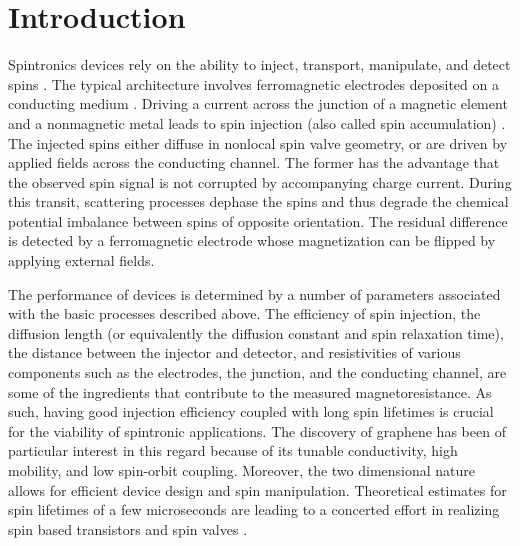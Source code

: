 \section{Introduction}

Spintronics devices rely on the ability to inject, transport, manipulate, and detect spins
\cite{Wolf16112001, RevModPhys.76.323}.
The typical architecture involves ferromagnetic electrodes deposited on a conducting medium
\cite{1990ApPhL..56..665D, Jedema2001}.
Driving a current across the junction of a magnetic element and a nonmagnetic metal
leads to spin injection (also called spin accumulation)
\cite{PhysRevLett.55.1790, Jedema2001, Yang2008, PhysRevLett.94.196601}.
The injected spins either diffuse in nonlocal spin valve geometry,
or are driven by applied fields across the conducting channel.
The former has the advantage that the observed spin signal
is not corrupted by accompanying charge current.
During this transit, scattering processes dephase the spins
and thus degrade the chemical potential imbalance between spins of opposite orientation.
The residual difference is detected by a ferromagnetic electrode
whose magnetization can be flipped by applying external fields.

The performance of devices is determined by a number of parameters
associated with the basic processes described above.
The efficiency of spin injection, the diffusion length
(or equivalently the diffusion constant and spin relaxation time),
the distance between the injector and detector,
and resistivities of various components such as the electrodes,
the junction, and the conducting channel,
are some of the ingredients that contribute to the measured magnetoresistance.
As such, having good injection efficiency coupled with long spin lifetimes
is crucial for the viability of spintronic applications.
The discovery of graphene
\cite{Novoselov22102004}
has been of particular interest in this regard
because of its tunable conductivity, high mobility, and low spin-orbit coupling.
Moreover, the two dimensional nature allows for efficient device design and spin manipulation.
Theoretical estimates for spin lifetimes of a few microseconds
\cite{PhysRevB.74.155426, Trauzettel2007}
are leading to a concerted effort in realizing spin based transistors and spin valves
\cite{Tombros2007, JJAP.46.L605, Cho2007, PhysRevLett.101.046601, 1704408, Han2012, Han2012369, PhysRevB.80.241403}.

